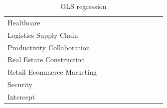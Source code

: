 \documentclass[12pt]{article}
\begin{document}
\begin{table} [ht]
\begin{tabular}{lccccccccc}
      Healthcare & & & & & & & & & \\
      Logistics Supply Chain & & & & & & & & & \\
      Productivity Collaboration & & & & & & & & & \\
      Real Estate Construction & & & & & & & & & \\
      Retail Ecommerce Marketing & & & & & & & & & \\
      Security & & & & & & & & & \\
      Intercept & & & & & & & & & \\
  \end{tabular}
\caption{OLS regression}
\label{table6}

\end{table}
\end{document}
